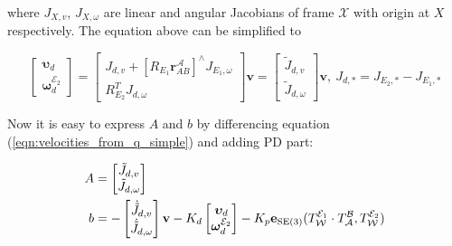 where $J_{X,v}$, $J_{X,\omega}$ are linear and angular Jacobians of frame 
$\mathcal{X}$ with origin at $X$ respectively. The equation above can be simplified  
to 

\begin{equation}
    \begin{bmatrix}
        \boldsymbol{\upsilon}_d \\
        \boldsymbol{\omega}_d^{\mathcal{E}_2}
    \end{bmatrix} = 
    \begin{bmatrix}
        J_{d, v} + [R_{E_1} \mathbf{r}_{AB}^{\mathcal{A}}]^{\wedge}
        J_{E_1, \omega}\\
        R_{E_2}^T J_{d, \omega}
    \end{bmatrix} \mathbf{v} = 
    \begin{bmatrix}
        \tilde{J}_{d,v} \\
        \tilde{J}_{d, \omega}
    \end{bmatrix}
    \mathbf{v}, \:
    J_{d, *} = J_{E_2, *} - J_{E_1, *}
    \label{eqn:velocities_from_q_simple}
\end{equation}

Now it is easy to express $A$ and $b$ by differencing equation 
(\ref{eqn:velocities_from_q_simple}) and adding PD part:

\begin{equation}
    \begin{aligned}
        A & = 
        \begin{bmatrix}
            \tilde{J}_{d,v} \\
            \tilde{J}_{d,\omega}
        \end{bmatrix} \\
        b & = 
        - 
        \begin{bmatrix}
            \dot{\tilde{J}}_{d,v} \\
            \dot{\tilde{J}}_{d,\omega}
        \end{bmatrix}
        \mathbf{v}
        -K_d
        \begin{bmatrix}
            \boldsymbol{\upsilon}_d \\
            \boldsymbol{\omega}_d^{\mathcal{E}_2}
        \end{bmatrix} 
        -K_p
        \mathbf{e}_{\text{SE}(3)}(
            T_{\mathcal{W}}^{\mathcal{E}_1} \cdot 
            T_{\mathcal{A}}^{\mathcal{B}},
            T_{\mathcal{W}}^{\mathcal{E}_2}
        )
    \end{aligned}
    \label{eqn:a_and_b}
\end{equation}

